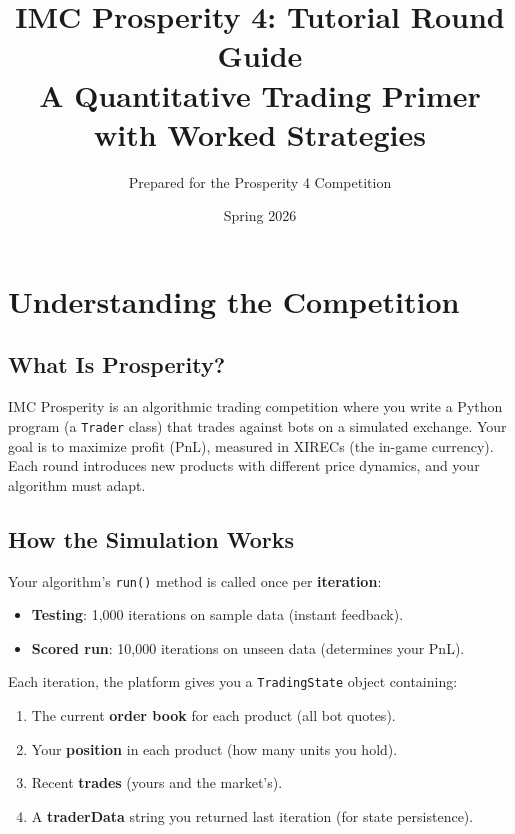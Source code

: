 \documentclass[11pt, letterpaper]{article}
\title{
    \vspace{-1cm}
    \textbf{IMC Prosperity 4: Tutorial Round Guide} \\[0.3cm]
    \large A Quantitative Trading Primer with Worked Strategies
}
\author{Prepared for the Prosperity 4 Competition}
\date{Spring 2026}
\begin{document}
\maketitle
\tableofcontents
\newpage

\section{Understanding the Competition}

\subsection{What Is Prosperity?}

IMC Prosperity is an algorithmic trading competition where you write a Python program (a \texttt{Trader} class) that trades against bots on a simulated exchange. Your goal is to maximize profit (PnL), measured in XIRECs (the in-game currency). Each round introduces new products with different price dynamics, and your algorithm must adapt.

\subsection{How the Simulation Works}

Your algorithm's \texttt{run()} method is called once per \textbf{iteration}:
\begin{itemize}
    \item \textbf{Testing}: 1{,}000 iterations on sample data (instant feedback).
    \item \textbf{Scored run}: 10{,}000 iterations on unseen data (determines your PnL).
\end{itemize}

Each iteration, the platform gives you a \texttt{TradingState} object containing:
\begin{enumerate}
    \item The current \textbf{order book} for each product (all bot quotes).
    \item Your \textbf{position} in each product (how many units you hold).
    \item Recent \textbf{trades} (yours and the market's).
    \item A \textbf{traderData} string you returned last iteration (for state persistence).
\end{enumerate}
\end{document}
